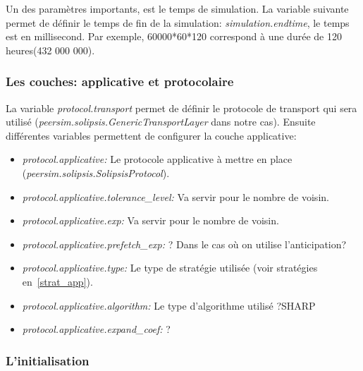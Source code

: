 \documentclass[11pt,a4paper]{article}
\begin{document}
Un des paramètres importants, est le temps de simulation. La variable suivante permet de définir le temps de fin de la simulation: \textit{simulation.endtime}, le temps est en millisecond. Par exemple, 60000*60*120 correspond à une durée de 120 heures(432 000 000). 

\subsubsection{Les couches: applicative et protocolaire}
La variable \textit{protocol.transport} permet de définir le protocole de transport qui sera utilisé (\textit{peersim.solipsis.GenericTransportLayer} dans notre cas). Ensuite différentes variables permettent de configurer la couche applicative:
\begin{itemize}
        \renewcommand{\labelitemi}{$\bullet$}
	\item \textit{protocol.applicative:} Le protocole applicative à mettre en place (\textit{peersim.solipsis.SolipsisProtocol}).
	\item \textit{protocol.applicative.tolerance\_level:} Va servir pour le nombre de voisin.
	\item \textit{protocol.applicative.exp:} Va servir pour le nombre de voisin.
	\item \textit{protocol.applicative.prefetch\_exp:} ? Dans le cas où on utilise l'anticipation?
	\item \textit{protocol.applicative.type:} Le type de stratégie utilisée (voir stratégies en~\ref{strat_app}).
	\item \textit{protocol.applicative.algorithm:} Le type d'algorithme utilisé ?SHARP
	\item \textit{protocol.applicative.expand\_coef:} ?
\end{itemize}

\subsubsection{L'initialisation}
\end{document}
